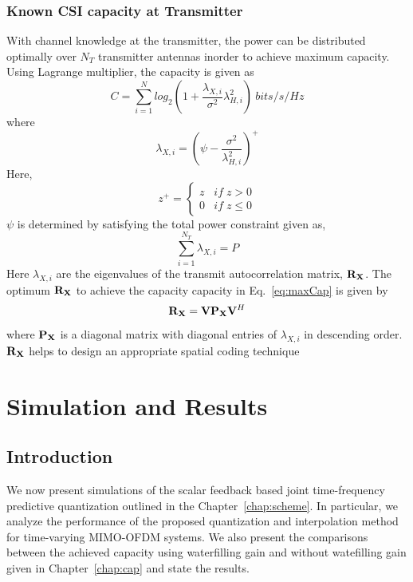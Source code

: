 \documentclass[11pt,a4paper]{report}
\def\bP{{\bf P}}
\def\bR{{\bf R}}
\def\bV{{\bf V}}
\def\bX{{\bf X}}
\begin{document}
\subsection{Known CSI capacity at Transmitter}
With channel knowledge at the transmitter, the power can be distributed
optimally over $N_T$ transmitter antennas inorder to achieve maximum
capacity. Using Lagrange multiplier, the capacity is given as
\begin{equation}
\label{eq:maxCap}
C = \sum_{i=1}^{N}log_{2}\left(1 + \frac{\lambda_{X,i}}{\sigma^2}\lambda^{2}_{H,i}\right)\: bits/s/Hz
\end{equation}
where 
\begin{equation}
\lambda_{X,i} = (\psi - \frac{\sigma^2}{\lambda^2_{H,i}})^{+}
\label{eq:lambda}
\end{equation}
Here,
\begin{equation}
    z^{+} =
    \begin{cases}
        z & if \;z>0\\
        0 & if \;z\leq0
    \end{cases}
\end{equation}
$\psi$ is determined by satisfying the total power constraint given as,
\begin{equation}
\sum_{i=1}^{N_T}\lambda_{X,i} = P    
\end{equation}
Here $\lambda_{X,i}$ are the eigenvalues of the transmit autocorrelation matrix, $\bR_{\bX}$.
The optimum $\bR_{\bX}$ to achieve the capacity capacity in Eq.~\ref{eq:maxCap}
is given by $$\bR_{\bX} = \bV \bP_\bX \bV^{H}$$ where $\bP_\bX$ is a
diagonal matrix with diagonal entries of $\lambda_{X,i}$ in descending
order. $\bR_\bX$ helps to design an appropriate  spatial coding technique

\chapter{Simulation and Results}

\section{Introduction}
We now present simulations of the scalar feedback based joint
time-frequency predictive quantization outlined in the Chapter~\ref{chap:scheme}. 
In particular, we analyze the performance of the proposed
quantization and interpolation method for time-varying MIMO-OFDM
systems. We also present the comparisons between the achieved capacity
using waterfilling gain and without watefilling gain given in 
Chapter~\ref{chap:cap} and state the results.
\end{document}
